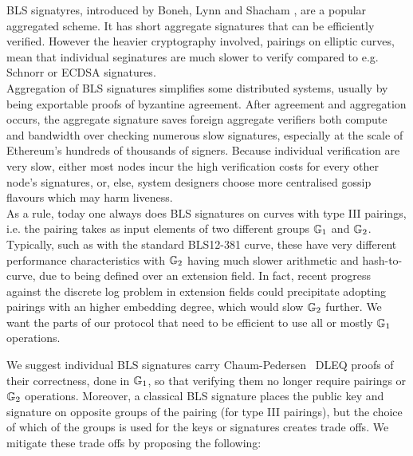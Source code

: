 
BLS signatyres, introduced by Boneh, Lynn and Shacham \cite{BLS_signatures}, are a popular aggregated scheme. 
It has short aggregate signatures that can be efficiently verified. However the heavier cryptography involved, pairings on elliptic curves, mean that individual seginatures are much slower to verify compared to e.g. Schnorr or ECDSA signatures. \\

Aggregation of BLS signatures \cite{BLS_signatures} simplifies some distributed systems,
usually by being exportable proofs of byzantine agreement. After agreement and aggregation occurs, 
the aggregate signature saves foreign aggregate verifiers both compute and bandwidth over checking
numerous slow signatures, especially at the scale of Ethereum's hundreds of thousands of signers.
Because individual verification are very slow, either most nodes incur the high verification 
costs for every other node's signatures, or, else, system designers choose more centralised gossip
flavours which may harm liveness. \\

As a rule, today one always does BLS signatures on curves with type III pairings,
i.e. the pairing takes as input elements of two different groups $\mathbb{G}_{1}$ and $\mathbb{G}_{2}$.
Typically, such as with the standard BLS12-381 curve, these have very different
performance characteristics with $\mathbb{G}_{2}$ having much slower arithmetic and hash-to-curve, due to
being defined over an extension field.  In fact, recent progress
\cite{TNFS} against the discrete log problem in extension fields
could precipitate adopting pairings with an higher embedding degree,
which would slow $\mathbb{G}_{2}$ further. 
We want the parts of our protocol that need to be efficient to use all or mostly $\mathbb{G}_{1}$ operations. \\


\begin{comment}
We suggest that gossip messages containing individual BLS signatures carry
a Chaum-Pedersen DLEQ proofs of their correctness, so that verifying
individual signatures no longer requires pairings.
%
We avoid complex bisection logic in aggregation this way too, but increase
signature message size by 32 bytes.
\end{comment}

We suggest individual BLS signatures carry Chaum-Pedersen~\cite{ChaumPedersen} DLEQ proofs of their correctness, done in $\mathbb{G}_{1}$, so that 
verifying them no longer require pairings or $\mathbb{G}_{2}$ operations. Moreover, a classical BLS signature 
places the public key and signature on opposite groups of the pairing (for type III pairings), 
but the choice of which of the groups is used for the keys or signatures creates trade offs. 
We mitigate these trade offs by proposing the following:

